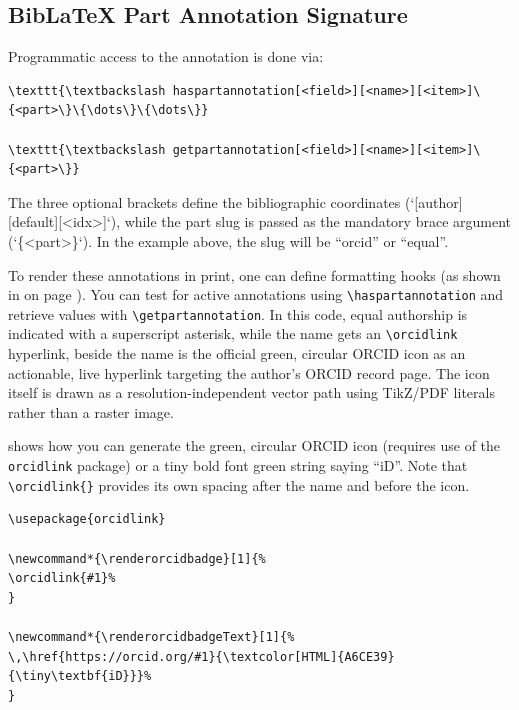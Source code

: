 \documentclass[12pt, twoside]{article}
\begin{document}
\subsection{BibLaTeX Part Annotation Signature}
Programmatic access to the annotation is done via:
\begin{small}
\begin{verbatim}
\texttt{\textbackslash haspartannotation[<field>][<name>][<item>]\{<part>\}\{\dots\}\{\dots\}}

\texttt{\textbackslash getpartannotation[<field>][<name>][<item>]\{<part>\}}
\end{verbatim}
\end{small}

The three optional brackets define the bibliographic coordinates (`[author][default][<idx>]`), while the part slug is passed as the mandatory brace argument (`\{<part>\}`). In the example above, the slug will be \enquote{orcid} or \enquote{equal}.

To render these annotations in print, one can define \BibLaTeX{} formatting hooks (as shown in  on page \pageref{lst:biberHookExample1A}). You can test for active annotations using \texttt{\textbackslash haspartannotation} and retrieve values with \texttt{\textbackslash getpartannotation}. In this code, equal authorship is indicated with a superscript asterisk, while the name gets an  \texttt{\textbackslash orcidlink} hyperlink, \ie beside the name is the official green, circular \gls{ORCID} icon as an actionable, live hyperlink targeting the author's \gls{ORCID} record page. The icon itself is drawn as a resolution-independent vector path using TikZ/PDF literals rather than a raster image.

 shows how you can generate the green, circular \gls{ORCID} icon (requires use of the \texttt{orcidlink} package) or a tiny bold font green string saying \enquote{iD}. Note that \texttt{\textbackslash orcidlink\{\}} provides its own spacing after the name and before the icon.

\begin{lstlisting}[style=latexExampleForAuthors, escapechar=|, basicstyle=\footnotesize, caption={{ORCID icon or colored text}}, label=lst:biberHookIconOrText]
\usepackage{orcidlink}

\newcommand*{\renderorcidbadge}[1]{%
\orcidlink{#1}%
}

\newcommand*{\renderorcidbadgeText}[1]{%
\,\href{https://orcid.org/#1}{\textcolor[HTML]{A6CE39}{\tiny\textbf{iD}}}%
}
\end{lstlisting}
\end{document}
